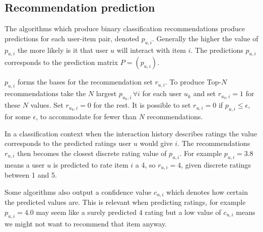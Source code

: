 
\subsection{Recommendation prediction}\label{sec:background:pred}

The algorithms which produce binary classification recommendations produce predictions for each user-item pair, denoted $p_{u, i}$. Generally the higher the value of $p_{u, i}$ the more likely is it that user $u$ will interact with item $i$. The predictions $p_{u, i}$ corresponds to the prediction matrix $P = (p_{u, i})$.

$p_{u, i}$ forms the bases for the recommendation set $r_{u, i}$. To produce Top-$N$ recommendations take the $N$ largest $p_{u_k, i} \, \forall i$ for each user $u_k$ and set $r_{u_k, i} = 1$ for these $N$ values. Set $r_{u_k, i} = 0$ for the rest. It is possible to set $r_{u, i} = 0$ if $p_{u, i} \leq \epsilon$, for some $\epsilon$, to accommodate for fewer than $N$ recommendations.

In a classification context when the interaction history describes ratings the value corresponds to the predicted ratings user $u$ would give $i$. The recommendations $r_{u, i}$ then becomes the closest discrete rating value of $p_{u, i}$. For example $p_{u, i} = 3.8$ means a user $u$ is predicted to rate item $i$ a 4, so $r_{u, i} = 4$, given discrete ratings between 1 and 5.

Some algorithms also output a confidence value $c_{u, i}$ which denotes how certain the predicted values are. This is relevant when predicting ratings, for example $p_{u, i} = 4.0$ may seem like a surely predicted 4 rating but a low value of $c_{u, i}$ means we might not want to recommend that item anyway.

